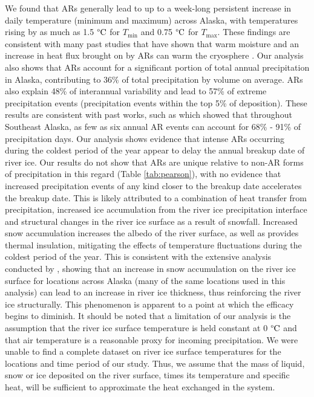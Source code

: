 \documentclass[12pts,draft]{AR_analysis_}
\begin{document}
We found that ARs generally lead to up to a week-long persistent 
increase in daily temperature (minimum and maximum) across Alaska, with 
temperatures rising by as much as 1.5 $\mathrm{\degree C}$ 
for $T_{\text{min}}$ and 0.75 $\mathrm{\degree C}$ for $T_{\text{max}}$. 
These findings are consistent with  
many past studies that have shown that warm moisture and an increase 
in heat flux brought on by ARs can 
warm the cryosphere
\cite{Wille2021, Ma2023, ARs_lead_to_sea_ice_loss, Zhang2023}.
Our analysis also shows that ARs account for a significant portion of
total annual precipitation 
in Alaska, contributing to 36\% of total precipitation by volume on 
average. ARs also explain 48\% 
of interannual variability and lead to 57\% of extreme precipitation events 
(precipitation events within the top 5\% of deposition). These results are
consistent with past works, such as  which showed that 
throughout Southeast Alaska, as few as six annual AR events can account for 
68\% - 91\% of precipitation days. Our analysis shows evidence that intense 
ARs occurring during the coldest period of the year appear to delay the 
annual breakup date of river ice. Our results do not show that ARs are 
unique relative to non-AR forms of 
precipitation in this regard (Table \ref{tab:pearson}), with no evidence 
that increased 
precipitation events of any kind closer to the breakup date accelerates the 
breakup date.
This is likely attributed to a combination of heat transfer from 
precipitation, increased ice accumulation from the river ice precipitation
interface and structural changes in the river ice surface as a result 
of snowfall.
Increased snow accumulation
increases the albedo of the river surface, as well as provides thermal
insulation, mitigating the effects of temperature 
fluctuations during the coldest period of the year. This is 
consistent with the extensive analysis conducted by , 
showing that an increase in snow accumulation on the river ice surface 
for locations across Alaska (many of the same locations used in this 
analysis) can lead to 
an increase in river ice thickness, thus reinforcing the river ice 
structurally. This phenomenon is apparent to a point at which the efficacy 
begins to diminish. It should be noted that a limitation of
our analysis is the assumption that the river ice surface temperature is 
held constant at 0 $\mathrm{\degree C}$ and that air temperature is a 
reasonable proxy for
incoming precipitation. We were unable to 
find a complete dataset on river ice surface temperatures for the locations and time 
period of our study. Thus, we assume that the mass of liquid, snow or ice deposited on 
the river surface, times its temperature and specific heat, will be sufficient to
approximate the heat exchanged in the system.   
\end{document}
